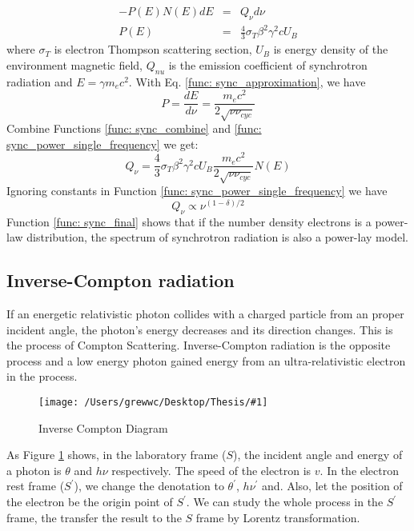 \documentclass[12pt]{report}
\newcommand{\singleFig}[3]{
  \begin{figure}[!ht]
    \centering
    \texttt{[image: /Users/grewwc/Desktop/Thesis/\#1]}
    \caption{#3}
    \label{fig: #1}
  \end{figure}
}
\begin{document}
            \begin{eqnarray}
              \label{func: sync_power_single_frequency}
              -P\left(E\right)N\left(E\right)dE &=& Q_{\nu} d\nu\\
              P\left(E\right) &=& \frac{4}{3} \sigma_{T} \beta^2 \gamma^2 c U_B
            \end{eqnarray} 
            where $\sigma_{T}$ is electron Thompson scattering section, $U_B$ is energy 
            density of the environment magnetic field,  $Q_{nu}$ is the emission coefficient 
            of synchrotron radiation and $E=\gamma m_e c^2$. With Eq. 
            \ref{func: sync_approximation}, we have
            \begin{equation}
              \label{func: sync_combine}
              P = \frac{dE}{d\nu} = \frac{m_e c^2}{2\sqrt{\nu \nu_{cyc}}}
            \end{equation}
            Combine Functions \ref{func: sync_combine} and 
            \ref{func: sync_power_single_frequency} we get:
            \begin{equation}
              Q_{\nu} = \frac{4}{3} \sigma_{T} \beta^2 \gamma^2 c U_B \frac{m_e c^2}{2\sqrt{\nu \nu_{cyc}}} N\left(E\right)
            \end{equation}
            Ignoring constants in Function \ref{func: sync_power_single_frequency} we have 
            \begin{equation}
              \label{func: sync_final}
              Q_{\nu} \propto \nu^{(1-\delta)/2}
            \end{equation}
            Function \ref{func: sync_final} shows that if the number density electrons is 
            a power-law distribution, the spectrum of synchrotron radiation is also a 
            power-lay model.  
            
          \subsection{Inverse-Compton radiation}
            If an energetic relativistic photon collides with a charged particle from an 
            proper incident angle, the photon's energy decreases and its direction changes. 
            This is the process of Compton Scattering. Inverse-Compton radiation is the 
            opposite process and a low energy photon gained energy from an ultra-relativistic 
            electron in the process. 

            \singleFig{inverse_compton}{0.45}{Inverse Compton Diagram}
            As Figure \ref{fig: inverse_compton} shows, in the laboratory frame ($S$), the 
            incident angle and energy of a photon is $\theta$ and $h \nu$ respectively. 
            The speed of the electron is $v$. In the electron rest frame ($S^{\prime}$), 
            we change the denotation to $\theta^{\prime}$, $h \nu^{\prime}$ and. Also, let 
            the position of the electron be the origin point of $S^{\prime}$. We can study 
            the whole process in the $S^{\prime}$ frame, the transfer the result to the $S$ 
            frame by Lorentz transformation. 
\end{document}
